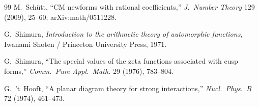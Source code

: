 \documentclass[11pt]{amsart}
\theoremstyle{definition}
\theoremstyle{remark}
\begin{document}
\begin{thebibliography}{99}
 M.~Sch\"utt, ``CM newforms with rational coefficients,'' \emph{J.\ Number Theory} 129 (2009), 25--60; arXiv:math/0511228.

 G.~Shimura, \emph{Introduction to the arithmetic theory of automorphic functions}, Iwanami Shoten / Princeton University Press, 1971.

 G.~Shimura, ``The special values of the zeta functions associated with cusp forms,'' \emph{Comm.\ Pure Appl.\ Math.} 29 (1976), 783--804.

 G.~'t~Hooft, ``A planar diagram theory for strong interactions,'' \emph{Nucl.\ Phys.\ B} 72 (1974), 461--473.

\end{thebibliography}
\end{document}
